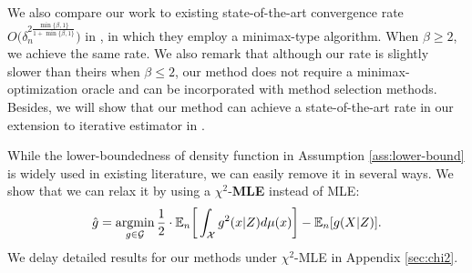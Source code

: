 We also compare our work to existing state-of-the-art convergence rate $O\big(\delta_n^{2\frac{\min\{\beta,1\}}{1+\min\{\beta,1\}}}\big)$ in \cite{bennett2023source}, in which they employ a minimax-type algorithm. When $\beta \geq 2$, we achieve the same rate. We also remark that although our rate is slightly slower than theirs when $\beta \leq 2$, our method does not require a minimax-optimization oracle and can be incorporated with method selection methods. Besides, we will show that our method can achieve a state-of-the-art rate 
in our extension to iterative estimator in .





\vspace{-2mm}
\begin{remark}\label{rem:bounded}
While the lower-boundedness of density function in  Assumption \ref{ass:lower-bound}  is widely used in existing literature, we can easily remove it in several ways. We show that we can relax it by using a $\chi^2$-\textbf{MLE} instead of MLE: 
 \begin{align}\label{eq:chi2-mle-est}
\hat{g} = \mathop{\mathrm{argmin}}_{g\in\mathcal{G}} \frac{1}{2}\cdot \mathbb{E}_n\bigg[\int_{\mathcal{X}} g^2(x|Z)d\mu(x)\bigg] - \mathbb{E}_n[g(X|Z)]. 
\end{align}
We delay detailed results for our methods under $\chi^2$-MLE in Appendix \ref{sec:chi2}.
\end{remark}
\vspace{-2mm}

